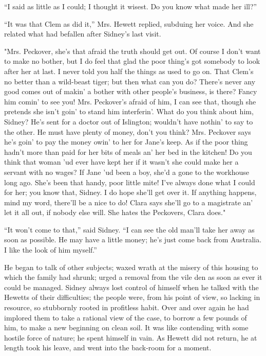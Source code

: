 ``I said as little as I could; I thought it wisest. Do you know what
made her ill?''

``It was that Clem as did it,'' Mrs. Hewett replied, subduing her voice.
And she related what had befallen after Sidney's last visit.

"Mrs. Peckover, she's that afraid the truth
{\protect\hypertarget{152}{}{}}should get out. Of course I don't want to
make no bother, but I do feel that glad the poor thing's got somebody to
look after her at last. I never told you half the things as used to go
on. That Clem's no better than a wild-beast tiger; but then what can you
do? There's never any good comes out of makin' a bother with other
people's business, is there? Fancy him comin' to see you! Mrs.
Peckover's afraid of him, I can see that, though she pretends she isn't
goin' to stand him interferin'. What do you think about him, Sidney?
He's sent for a doctor out of Islington; wouldn't have nothin' to say to
the other. He must have plenty of money, don't you think? Mrs. Peckover
says he's goin' to pay the money owin' to her for Jane's keep. As if the
poor thing hadn't more than paid for her bits of meals an' her bed in
the kitchen! Do you think that woman 'ud ever have kept her if it wasn't
she could make her a servant with no wages? If Jane 'ud been a boy,
she'd a gone to the workhouse long ago. She's been that handy,
{\protect\hypertarget{153}{}{}}poor little mite! I've always done what I
could for her; you know that, Sidney. I do hope she'll get over it. If
anything happens, mind my word, there'll be a nice to do! Clara says
she'll go to a magistrate an' let it all out, if nobody else will. She
hates the Peckovers, Clara does."

``It won't come to that,'' said Sidney. ``I can see the old man'll take
her away as soon as possible. He may have a little money; he's just come
back from Australia. I like the look of him myself.''

He began to talk of other subjects; waxed wrath at the misery of this
housing to which the family had shrunk; urged a removal from the vile
den as soon as ever it could be managed. Sidney always lost control of
himself when he talked with the Hewetts of their difficulties; the
people were, from his point of view, so lacking in resource, so
stubbornly rooted in profitless habit. Over and over again he had
implored them to take a rational view of the case, to borrow a few
pounds of him, to make a new beginning on clean soil.
{\protect\hypertarget{154}{}{}}It was like contending with some hostile
force of nature; he spent himself in vain. As Hewett did not return, he
at length took his leave, and went into the back-room for a moment.

